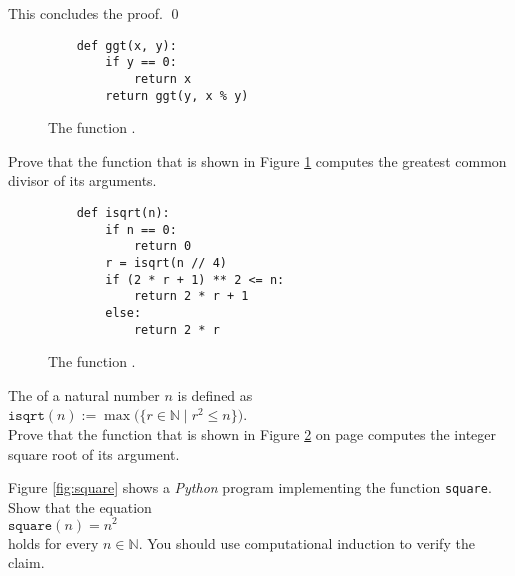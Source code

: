 This concludes the proof. \qed

\begin{figure}[!h]
  \centering
\begin{verbatim}
    def ggt(x, y):
        if y == 0:
            return x
        return ggt(y, x % y)
\end{verbatim}
\vspace*{-0.3cm}
  \caption{The function .}
  \label{fig:gcd}
\end{figure}

\exerciseEng
Prove that the function  that is shown in Figure \ref{fig:gcd} computes the greatest common divisor
of its arguments. \eox

\begin{figure}[!h]
  \centering
\begin{verbatim}
    def isqrt(n):
        if n == 0:
            return 0
        r = isqrt(n // 4)
        if (2 * r + 1) ** 2 <= n:
            return 2 * r + 1
        else:
            return 2 * r
\end{verbatim}
\vspace*{-0.3cm}
  \caption{The function .}
  \label{fig:isqrt}
\end{figure} 

\exerciseEng
The  of a natural number $n$ is defined as 
\\[0.2cm]
\hspace*{1.3cm}
$\texttt{isqrt}(n) := \max\bigl(\{ r \in \mathbb{N} \mid r^2 \leq n \}\bigr)$.
\\[0.2cm]
Prove that the function  that is shown in Figure \ref{fig:isqrt} on page \pageref{fig:isqrt}
computes the integer square root of its argument. \eox
\pagebreak

\exerciseEng
Figure \ref{fig:square} shows a \textsl{Python} program implementing the function \texttt{square}.  Show that the equation
\\[0.2cm]
\hspace*{1.3cm}
$\mathtt{square}(n) = n^2$
\\[0.2cm]
holds for every $n \in \mathbb{N}$.  You should use computational induction to verify the claim. \eox

